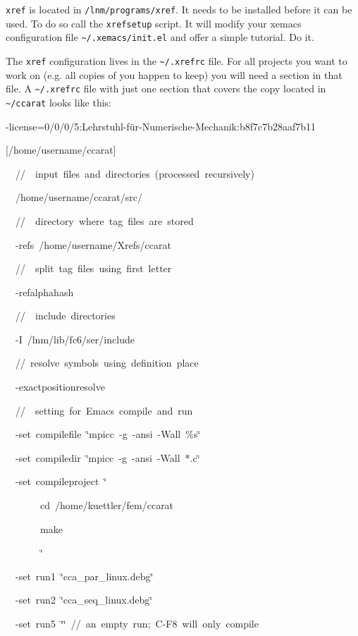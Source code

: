 \texttt{xref} is located in \texttt{/lnm/programs/xref}. It needs
to be installed before it can be used. To do so call the \texttt{xrefsetup}
script. It will modify your xemacs configuration file \texttt{\textasciitilde{}/.xemacs/init.el}
and offer a simple tutorial. Do it.

The \texttt{xref} configuration lives in the \texttt{\textasciitilde{}/.xrefrc}
file. For all projects you want to work on (e.g. all copies of \ccarat{}
you happen to keep) you will need a section in that file. A \texttt{\textasciitilde{}/.xrefrc}
file with just one section that covers the \ccarat{} copy located
in \texttt{\textasciitilde{}/ccarat} looks like this:

\begin{lyxcode}
-license=0/0/0/5:Lehrstuhl-f\"ur-Numerische-Mechanik:b8f7c7b28aaf7b11



{[}/home/username/ccarat]

~~//~~input~files~and~directories~(processed~recursively)

~~/home/username/ccarat/src/

~~//~~directory~where~tag~files~are~stored

~~-refs~/home/username/Xrefs/ccarat

~~//~~split~tag~files~using~first~letter

~~-refalphahash

~~//~~include~directories

~~-I~/lnm/lib/fc6/ser/include

~~//~resolve~symbols~using~definition~place

~~-exactpositionresolve

~~//~~setting~for~Emacs~compile~and~run

~~-set~compilefile~\char`\"{}mpicc~-g~-ansi~-Wall~\%s\char`\"{}

~~-set~compiledir~\char`\"{}mpicc~-g~-ansi~-Wall~{*}.c\char`\"{}

~~-set~compileproject~\char`\"{}

~~~~~~~cd~/home/kuettler/fem/ccarat

~~~~~~~make

~~~~~~~\char`\"{}

~~-set~run1~\char`\"{}cca\_par\_linux.debg\char`\"{}

~~-set~run2~\char`\"{}cca\_seq\_linux.debg\char`\"{}

~~-set~run5~\char`\"{}\char`\"{}~//~an~empty~run;~C-F8~will~only~compile


\end{lyxcode}
